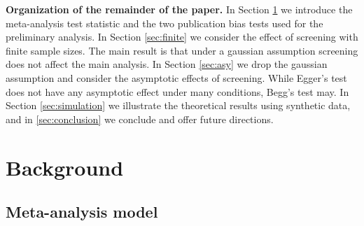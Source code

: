 \documentclass[12pt]{article}
\begin{document}





\textbf{Organization of the remainder of the paper.} In Section
\ref{sec:background} we introduce the meta-analysis test statistic and
the two publication bias tests used for the preliminary analysis. In
Section \ref{sec:finite} we consider the effect of screening with
finite sample sizes. The main result is that under a gaussian
assumption screening does not affect the main analysis. In Section
\ref{sec:asy} we drop the gaussian assumption and consider the
asymptotic effects of screening. While Egger's test does not have any
asymptotic effect under many conditions, Begg's test may. In Section
\ref{sec:simulation} we illustrate the theoretical results using
synthetic data, and in \ref{sec:conclusion} we conclude and offer
future directions.



\section{Background}
\label{sec:background}
\subsection{Meta-analysis model}


\end{document}
